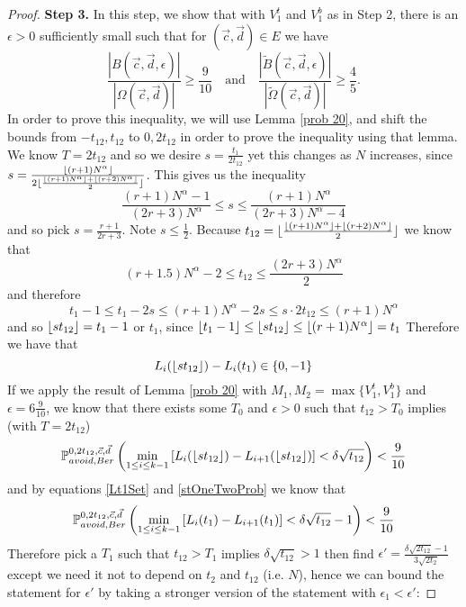 \begin{proof}
	{\bf \raggedleft Step 3.} In this step, we show that with $V_1^t$ and $V_1^b$ as in Step 2, there is an $\epsilon > 0$ sufficiently small such that for $(\vec{c}, \vec{d}) \in E$ we have
	\begin{equation}\label{LemmaBP2Step3}
	\frac{|B(\vec{c}, \vec{d}, \epsilon)|}{|\Omega(\vec{c}, \vec{d})|} \geq  \frac{9}{10} \quad \mathrm{and} \quad \frac{|\tilde{B}(\vec{c}, \vec{d}, \epsilon)|}{|\tilde{\Omega}(\vec{c}, \vec{d})|} \geq  \frac{4}{5}.
	\end{equation}
	In order to prove this inequality, we will use Lemma \ref{prob 20}, and shift the bounds from $-t_{12},t_{12}$ to $0, 2t_{12}$ in order to prove the inequality using that lemma.
	We know $T=2t_{12}$ and so we desire $s=\frac{t_1}{2t_{12}}$ yet this changes as $N$ increases, since $s=\frac{\lfloor(r+1)N^\alpha\rfloor}{2\lfloor\frac{\lfloor(r+1)N^\alpha\rfloor+\lfloor(r+2)N^\alpha\rfloor}{2}\rfloor}$. This gives us the inequality \[
	\frac{(r+1)N^\alpha-1}{(2r+3)N^\alpha}\leq s\leq \frac{(r+1)N^\alpha}{(2r+3)N^\alpha-4}
	\]
	and so pick $s=\frac{r+1}{2r+3}$. Note $s\leq \frac{1}{2}$. Because $t_{12}=\lfloor\frac{\lfloor(r+1)N^\alpha\rfloor+\lfloor(r+2)N^\alpha\rfloor}{2}\rfloor$ we know that
	\[
	(r+1.5)N^\alpha-2\leq t_{12}\leq \frac{(2r+3)N^\alpha}{2}
	\]
	and therefore 
	\[
	t_1-1\leq t_1-2s\leq (r+1)N^\alpha-2s\leq s\cdot 2t_{12}\leq (r+1)N^\alpha
	\]
	and so $\lfloor st_{12}\rfloor=t_1-1$ or $t_1$, since $\lfloor t_1-1\rfloor\leq \lfloor st_{12}\rfloor\leq \lfloor(r+1)N^\alpha\rfloor=t_1$
	Therefore we have that 
	\begin{equation}\label{Lt1Set}L_i(\lfloor st_{12}\rfloor)-L_i(t_1)\in \{0,-1\}
	\end{equation} If we apply the result of Lemma \ref{prob 20} with $M_1,M_2=\max\{V_1^t,V_1^b\}$ and $\epsilon=6\frac{9}{10}$, we know that there exists some $T_0$ and $\epsilon>0$ such that $t_{12}>T_0$ implies (with $T=2t_{12}$)
	\begin{equation}\label{stOneTwoProb}
	\mathbb{P}^{0,2t_{12},\vec c, \vec d}_{avoid,Ber}\left(\min_{1\leq i\leq k-1} \left[L_i(\lfloor st_{12}\rfloor)-L_{i+1}(\lfloor st_{12}\rfloor)\right]<\delta\sqrt{t_{12}}\right)<\frac{9}{10}
	\end{equation}
	and by equations \ref{Lt1Set} and \ref{stOneTwoProb} we know that
	\[
	\mathbb{P}^{0,2t_{12},\vec c, \vec d}_{avoid,Ber}\left(\min_{1\leq i\leq k-1} \left[L_i(t_1)-L_{i+1}(t_1)\right]<\delta\sqrt{t_{12}}-1\right)<\frac{9}{10}
	\]
	Therefore pick a $T_1$ such that $t_{12}>T_1$ implies $\delta\sqrt{t_{12}}>1$ then find $\epsilon'=\frac{\delta\sqrt{2t_{12}}-1}{3\sqrt{2t_2}}$ except we need it not to depend on $t_2$ and $t_{12}$ (i.e. $N$), hence we can bound the statement for $\epsilon'$ by taking a stronger version of the statement with $\epsilon_1<\epsilon'$: 

\end{proof}
